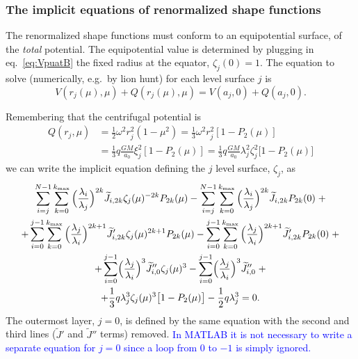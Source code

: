 \documentclass[amsmath,amsfonts,rmp,letterpaper]{revtex4}
\newcommand{\sub}[1]{_{\text{#1}}} %
\newcommand{\ptk}{P_{2k}}
\newcommand{\kmax}{k\sub{max}}
\newcommand{\ML}[1]{{\textcolor{blue}{#1}}}
\newcommand{\Jtil}{\widetilde{J}}
\newcommand{\sumkmax}{\sum_{k=0}^{\kmax}}
\begin{document}
\subsubsection{The implicit equations of renormalized shape functions}

The renormalized shape functions must conform to an equipotential surface, of the
\emph{total} potential. The equipotential value is determined by plugging in
eq.~\eqref{eq:VpuatB} the fixed radius at the equator, $\zeta_j(0)=1$. The
equation to solve (numerically, e.g.~by lion hunt) for each level surface $j$ is
\begin{equation}
V(r_j(\mu),\mu) + Q(r_j(\mu),\mu) = V(a_j,0) + Q(a_j,0).
\end{equation}

Remembering that the centrifugal potential is
\begin{equation*}
\begin{split}
Q(r_j,\mu) &= \frac{1}{2}\omega^2r_j^2(1-\mu^2) =
\frac{1}{3}\omega^2r_j^2[1 - P_2(\mu)] \\
&= \frac{1}{3}q\frac{GM}{a_0}\xi_j^2[1 - P_2(\mu)] =
\frac{1}{3}q\frac{GM}{a_0}\lambda_j^2\zeta_j^2\bigl[1 - P_2(\mu)\bigr]
\end{split}
\end{equation*}
we can write the implicit equation defining the $j$ level surface, $\zeta_j$, as
\begin{multline}\label{eq:implicit_zeta_equation}
\sum_{i=j}^{N-1}\sumkmax{}\Bigl(\frac{\lambda_i}{\lambda_j}\Bigr)^{2k}
\Jtil_{i,2k}\zeta_j(\mu)^{-2k}\ptk(\mu) -
\sum_{i=j}^{N-1}\sumkmax{}\Bigl(\frac{\lambda_i}{\lambda_j}\Bigr)^{2k}
\Jtil_{i,2k}\ptk(0)\; +\\
+\sum_{i=0}^{j-1}\sumkmax{}\Bigl(\frac{\lambda_j}{\lambda_i}\Bigr)^{2k+1}
\Jtil'_{i,2k}\zeta_j(\mu)^{2k+1}\ptk(\mu) -
\sum_{i=0}^{j-1}\sumkmax{}\Bigl(\frac{\lambda_j}{\lambda_i}\Bigr)^{2k+1}
\Jtil'_{i,2k}\ptk(0)\; +\\
+\sum_{i=0}^{j-1}\Bigl(\frac{\lambda_j}{\lambda_i}\Bigr)^3
\Jtil''_{i,0}\zeta_j(\mu)^3 -
\sum_{i=0}^{j-1}\Bigl(\frac{\lambda_j}{\lambda_i}\Bigr)^3
\Jtil''_{i,0}\; +\\
+\frac{1}{3}q\lambda_j^3\zeta_j(\mu)^3\bigl[1 - P_2(\mu)\bigr] -
\frac{1}{2}q\lambda_j^3 = 0.
\end{multline}
The outermost layer, $j=0$, is defined by the same equation with the second and
third lines ($\Jtil'$ and $\Jtil''$ terms) removed. \ML{In MATLAB it is not
necessary to write a separate equation for $j=0$ since a loop from $0$ to $-1$ is
simply ignored.}



\end{document}
